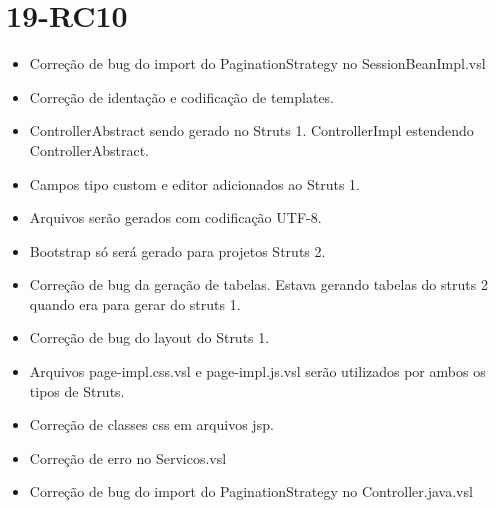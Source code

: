 \section{19-RC10}

\begin{itemize}
  \item Correção de bug do import do PaginationStrategy no SessionBeanImpl.vsl
  \item Correção de identação e codificação de templates.
  \item ControllerAbstract sendo gerado no Struts 1. ControllerImpl estendendo ControllerAbstract.
  \item Campos tipo custom e editor adicionados ao Struts 1.
  \item Arquivos serão gerados com codificação UTF-8.
  \item Bootstrap só será gerado para projetos Struts 2.
  \item Correção de bug da geração de tabelas. Estava gerando tabelas do struts 2 quando era para gerar do struts 1.
  \item Correção de bug do layout do Struts 1.
  \item Arquivos page-impl.css.vsl e page-impl.js.vsl serão utilizados por ambos os tipos de Struts.
  \item Correção de classes css em arquivos jsp.
  \item Correção de erro no Servicos.vsl
  \item Correção de bug do import do PaginationStrategy no Controller.java.vsl
\end{itemize}

